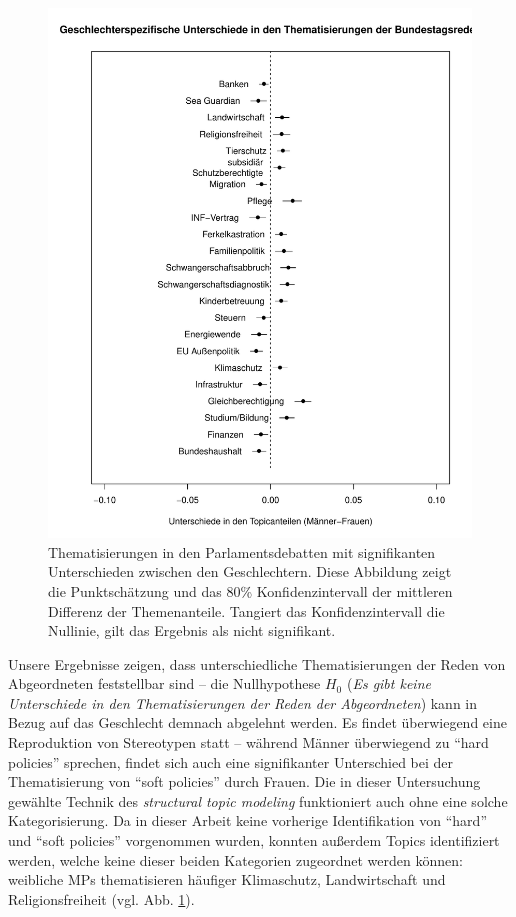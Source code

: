 \documentclass[12pt, 
    twoside=false, 
    bibliography=totoc, 
    numbers=endperiod, 
    headings=normal, 
    toc=chapterentrydotfill
    ]{scrbook}
\begin{document}
\begin{figure}[H]
    \centering
    \includegraphics[scale=0.6]{images/stm_differences_top.pdf}
    \caption[Thematisierungen in den Parlamentsdebatten mit signifikanten Unterschieden zwischen den Geschlechtern]{Thematisierungen in den Parlamentsdebatten mit signifikanten Unterschieden zwischen den Geschlechtern. Diese Abbildung zeigt die Punktschätzung und das 80\% Konfidenzintervall der mittleren Differenz der Themenanteile. Tangiert das Konfidenzintervall die Nullinie, gilt das Ergebnis als nicht signifikant.}
    \label{fig:differences_stm_top}
\end{figure}


Unsere Ergebnisse zeigen, dass unterschiedliche Thematisierungen der Reden von Abgeordneten feststellbar sind -- die Nullhypothese $H_0$ (\emph{Es gibt keine Unterschiede in den Thematisierungen der Reden der Abgeordneten}) kann in Bezug auf das Geschlecht demnach abgelehnt werden. Es findet überwiegend eine Reproduktion von Stereotypen statt -- während Männer überwiegend zu \enquote{hard policies} sprechen, findet sich auch eine signifikanter Unterschied bei der Thematisierung von \enquote{soft policies} durch Frauen.
Die in dieser Untersuchung gewählte Technik des \emph{structural topic modeling} funktioniert auch ohne eine solche Kategorisierung. Da in dieser Arbeit keine vorherige Identifikation von \enquote{hard} und \enquote{soft policies} vorgenommen wurden, konnten außerdem Topics identifiziert werden, welche keine dieser beiden Kategorien zugeordnet werden können: weibliche MPs thematisieren häufiger Klimaschutz, Landwirtschaft und Religionsfreiheit (vgl. Abb. \ref{fig:differences_stm_top}).
\end{document}
